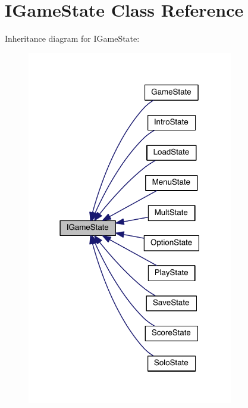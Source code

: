 \hypertarget{class_i_game_state}{}\section{I\+Game\+State Class Reference}
\label{class_i_game_state}


Inheritance diagram for I\+Game\+State\+:\nopagebreak
\begin{figure}[H]
\begin{center}
\leavevmode
\includegraphics[width=255pt]{class_i_game_state__inherit__graph}
\end{center}
\end{figure}
